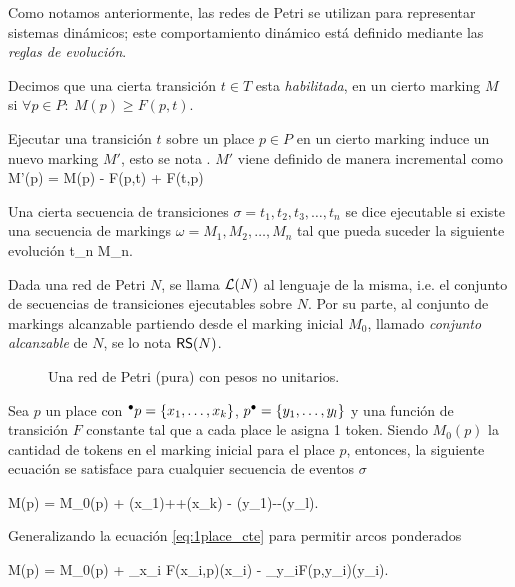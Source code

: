 Como notamos anteriormente, las redes de Petri se utilizan para representar sistemas 
dinámicos; este comportamiento dinámico está definido mediante las \emph{reglas de evolución}.

Decimos que una cierta transición $t \in T$ esta \emph{habilitada},
en un cierto marking $M$ si \mbox{$\forall p \in P:~ M(p) \ge F(p,t) $}.

Ejecutar una transición $t$ sobre un place $p \in P$ en un cierto marking induce 
un nuevo marking $M'$, esto se nota .
$M'$ viene definido de manera incremental como
\bequation
    M'(p) = M(p) - F(p,t) +  F(t,p)
\eequation

Una cierta secuencia de transiciones \mbox{$\sigma = t_1,t_2, t_3, \ldots, t_n$}
se dice ejecutable si existe una secuencia de markings \mbox{$\omega = M_1, M_2, \ldots, M_n$}
tal que pueda suceder la siguiente evolución
\bequation
     {t_n} {M_n}.
\eequation

Dada una red de Petri $N$, se llama $\mathcal{L}(N)$ al lenguaje de la misma, i.e.
el conjunto de secuencias de transiciones ejecutables sobre $N$.
Por su parte, al conjunto de markings alcanzable partiendo desde el marking inicial $M_0$,
llamado \emph{conjunto alcanzable} de $N$, se lo nota $\textsf{RS}(N)$.

\begin{figure}[t]
  	\centering
    
    \caption{Una red de Petri (pura) con pesos no unitarios.}
    \label{fig:pn1}
\end{figure}

Sea $p$ un place con \mbox{$\mbox{$^\bullet p$}=\{x_1,\ldots,x_k\}$}, \mbox{$\mbox{$p^\bullet$}=\{y_1,\ldots,y_l\}$} 
y una función de transición $F$ constante  tal que a cada place le asigna 1 token.
Siendo $M_0(p)$ la cantidad de tokens en el marking inicial 
para el place $p$, entonces, la siguiente ecuación
se satisface para cualquier secuencia de eventos $\sigma$

    M(p) = M_0(p) + \widehat\sigma(x_1)+\cdots +\widehat\sigma(x_k) - \widehat\sigma(y_1)-\cdots -\widehat\sigma(y_l).
\eequation

Generalizando la  ecuación \eqref{eq:1place_cte} para permitir arcos ponderados

    M(p) = M_0(p) + \sum_{x_i \in {}}F(x_i,p)\cdot \widehat\sigma(x_i) - \sum_{y_i\in{}}F(p,y_i)\cdot\widehat\sigma(y_i).
\eequation

